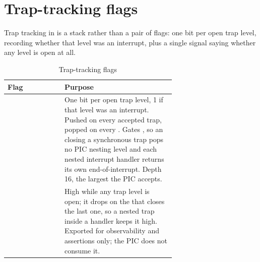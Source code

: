 \section{Trap-tracking flags}

Trap tracking in  is a stack rather than a pair of flags: one
bit per open trap level, recording whether that level was an interrupt, plus a
single signal saying whether any level is open at all.

\begin{table}[H]
\centering
\caption{Trap-tracking flags}
\label{tab:trapflags}
\begin{tabular}{@{}lL{0.66\linewidth}@{}}
\toprule
\textbf{Flag} & \textbf{Purpose} \\
\midrule
{} & One bit per open trap level, 1 if that level was an interrupt.
  Pushed on every accepted trap, popped on every . Gates
  , so an  closing a synchronous trap pops no PIC nesting
  level and each nested interrupt handler returns its own end-of-interrupt.
  Depth 16, the largest  the PIC accepts. \\
 & High while any trap level is open; it drops on the 
  that closes the last one, so a nested trap inside a handler keeps it high.
  Exported for observability and assertions only; the PIC does not consume it. \\
\bottomrule
\end{tabular}
\end{table}

